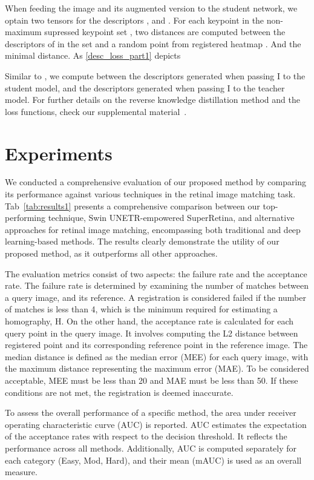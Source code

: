 \documentclass[10pt,twocolumn,letterpaper]{article}
\begin{document}
When feeding the image  and its augmented version  to the student network, we optain two tensors for the descriptors , and . For each keypoint  in the non-maximum supressed keypoint set , two distances are computed  between the descriptors of  in the set  and a random point from registered heatmap . And  the minimal distance. As \ref{desc_loss_part1} depicts

Similar to , we compute  between the descriptors generated when passing I to the student model, and the descriptors generated when passing I to the teacher model. For further details on the reverse knowledge distillation method and the loss functions, check our supplemental material~\cite{Authors14}.




\section{Experiments}
\label{sec:experiments}
We conducted a comprehensive evaluation of our proposed method by comparing its performance against various techniques in the retinal image matching task. Tab~\ref{tab:results1} presents a comprehensive comparison between our top-performing technique, Swin UNETR-empowered SuperRetina, and alternative approaches for retinal image matching, encompassing both traditional and deep learning-based methods. The results clearly demonstrate the utility of our proposed method, as it outperforms all other approaches.

The evaluation metrics consist of two aspects: the failure rate and the acceptance rate. The failure rate is determined by examining the number of matches between a query image, and its reference. A registration is considered failed if the number of matches is less than 4, which is the minimum required for estimating a homography, H. On the other hand, the acceptance rate is calculated for each query point in the query image. It involves computing the L2 distance between registered point and its corresponding reference point in the reference image. The median distance is defined as the median error (MEE) for each query image, with the maximum distance representing the maximum error (MAE). To be considered acceptable, MEE must be less than 20 and MAE must be less than 50. If these conditions are not met, the registration is deemed inaccurate. 

To assess the overall performance of a specific method, the area under receiver operating characteristic curve (AUC) is reported. AUC estimates the expectation of the acceptance rates with respect to the decision threshold. It reflects the performance across all methods. Additionally, AUC is computed separately for each category (Easy, Mod, Hard), and their mean (mAUC) is used as an overall measure.
\end{document}

